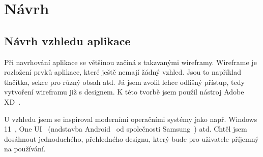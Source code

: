 
\chapter{Návrh}

\section{Návrh vzhledu aplikace}

Při navrhování aplikace se většinou začíná s takzvanými wireframy. Wireframe je rozložení prvků aplikace, které ještě
nemají žádný vzhled. Jsou to například tlačítka, sekce pro různý obsah atd. Já jsem zvolil lehce odlišný přístup, tedy
vytvoření wireframu již s designem. K této tvorbě jsem použil nástroj Adobe XD~\cite{}.                                  %

U vzhledu jsem se inspiroval moderními operačními systémy jako např. Windows 11~\cite{}, One UI~\cite{}                  %
(nadstavba Android~\cite{} od společnosti Samsung~\cite{}) atd.                                                          %
Chtěl jsem dosáhnout jednoduchého, přehledného designu, který bude pro uživatele příjemný na používání.
